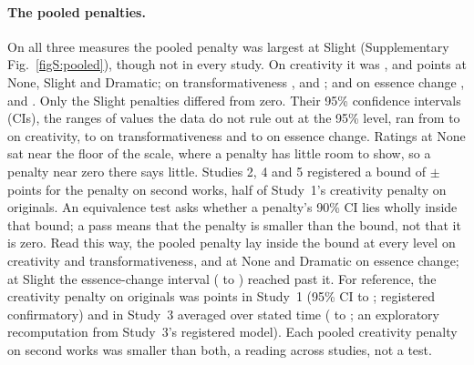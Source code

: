 \paragraph*{The pooled penalties.}
On all three measures the pooled penalty was largest at Slight (Supplementary Fig.~\ref{figS:pooled}), though not in every study. On creativity it was \XSCreatPenaltyNoneEst, \XSCreatPenaltySlightEst{} and \XSCreatPenaltyDramaticEst{} points at None, Slight and Dramatic; on transformativeness \XSTransPenaltyNoneEst, \XSTransPenaltySlightEst{} and \XSTransPenaltyDramaticEst; and on essence change \XSEssPenaltyNoneEst, \XSEssPenaltySlightEst{} and \XSEssPenaltyDramaticEst. Only the Slight penalties differed from zero. Their 95\% confidence intervals (CIs), the ranges of values the data do not rule out at the 95\% level, ran from \XSCreatPenaltySlightLo{} to \XSCreatPenaltySlightHi{} on creativity, \XSTransPenaltySlightLo{} to \XSTransPenaltySlightHi{} on transformativeness and \XSEssPenaltySlightLo{} to \XSEssPenaltySlightHi{} on essence change. Ratings at None sat near the floor of the scale, where a penalty has little room to show, so a penalty near zero there says little. Studies 2, 4 and 5 registered a bound of $\pm$\SourceBound{} points for the penalty on second works, half of Study~1's creativity penalty on originals. An equivalence test asks whether a penalty's 90\% CI lies wholly inside that bound; a pass means that the penalty is smaller than the bound, not that it is zero. Read this way, the pooled penalty lay inside the bound at every level on creativity and transformativeness, and at None and Dramatic on essence change; at Slight the essence-change interval (\XSEssPenaltySlightLoNinety{} to \XSEssPenaltySlightHiNinety) reached past it. For reference, the creativity penalty on originals was \XSOriginalsSOneEst{} points in Study~1 (95\% CI \XSOriginalsSOneLo{} to \XSOriginalsSOneHi; registered confirmatory) and \XSOriginalsSThreeEst{} in Study~3 averaged over stated time (\XSOriginalsSThreeLo{} to \XSOriginalsSThreeHi; an exploratory recomputation from Study~3's registered model). Each pooled creativity penalty on second works was smaller than both, a reading across studies, not a test.

